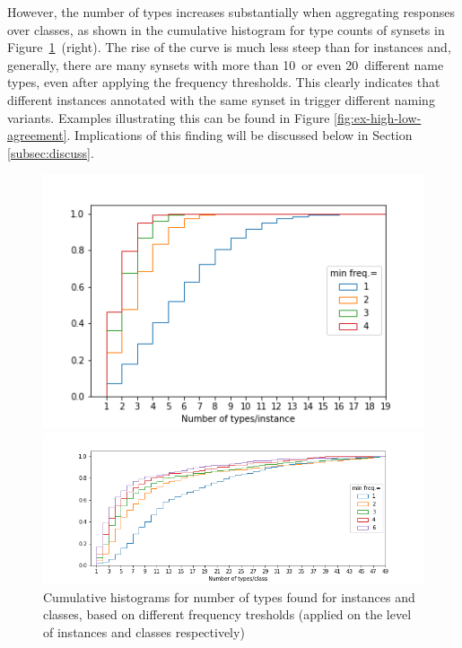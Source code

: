 However, the number of types increases substantially when aggregating responses over classes, as shown in the cumulative histogram for type counts of synsets in Figure\ \ref{fig:ntypes}\ (right).
The rise of the curve is much less steep than for instances and, generally, there are many synsets with more than 10\ or even 20\ different name types, even after applying the frequency thresholds. This clearly indicates that different instances annotated with the same 
synset in \vg trigger different naming variants. Examples illustrating this can be found in Figure \ref{fig:ex-high-low-agreement}. 
Implications of this finding will be discussed below in Section \ref{subsec:discuss}.

\begin{figure}
\begin{minipage}[b]{0.4\linewidth}
\includegraphics[scale=.4]{figures/types_instances.png}
\end{minipage}
\begin{minipage}[b]{0.6\linewidth}
\includegraphics[scale=.4]{figures/types_classes.png}
\end{minipage}
 \caption{\label{fig:ntypes} Cumulative histograms for number of types found for instances and classes, based on different frequency tresholds (applied on the level of instances and classes respectively)}
\end{figure}

